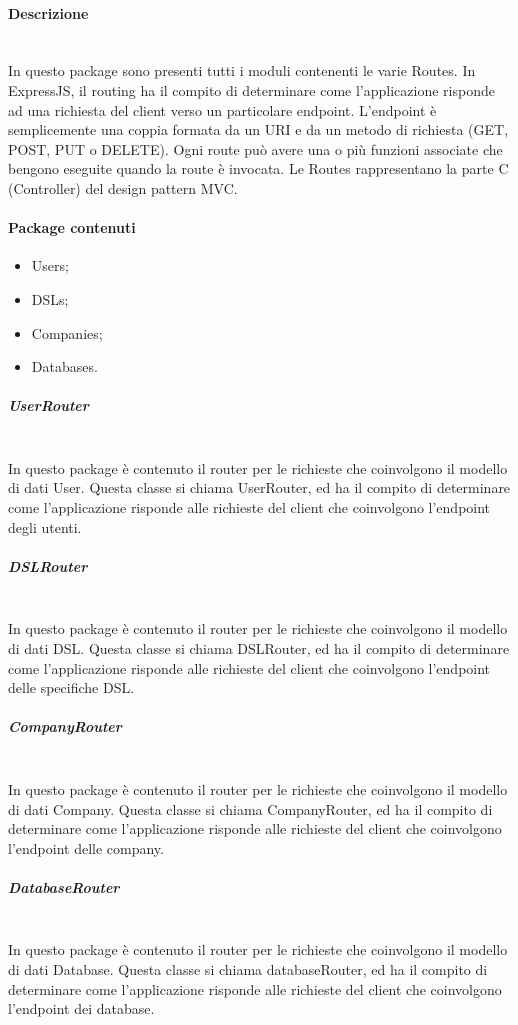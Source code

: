 \paragraph{Descrizione} \mbox{}\\
In questo package sono presenti tutti i moduli contenenti le varie Routes. In ExpressJS, il routing ha il compito di determinare come l'applicazione risponde ad una richiesta del client verso un particolare endpoint. L'endpoint è semplicemente una coppia formata da un URI e da un metodo di richiesta (GET, POST, PUT o DELETE). Ogni route può avere una o più funzioni associate che bengono eseguite quando la route è invocata. Le Routes rappresentano la parte C (Controller) del design pattern MVC.
\paragraph{Package contenuti}
\begin{itemize}
\item Users;
\item DSLs;
\item Companies;
\item Databases.
\end{itemize}
\subparagraph{UserRouter} \mbox{}\\
In questo package è contenuto il router per le richieste che coinvolgono il modello di dati User. Questa classe si chiama UserRouter, ed ha il compito di determinare come l'applicazione risponde alle richieste del client che coinvolgono l'endpoint degli utenti. 
\subparagraph{DSLRouter} \mbox{}\\
In questo package è contenuto il router per le richieste che coinvolgono il modello di dati DSL. Questa classe si chiama DSLRouter, ed ha il compito di determinare come l'applicazione risponde alle richieste del client che coinvolgono l'endpoint delle specifiche DSL. 
\subparagraph{CompanyRouter} \mbox{}\\
In questo package è contenuto il router per le richieste che coinvolgono il modello di dati Company. Questa classe si chiama CompanyRouter, ed ha il compito di determinare come l'applicazione risponde alle richieste del client che coinvolgono l'endpoint delle company. 
\subparagraph{DatabaseRouter} \mbox{}\\
In questo package è contenuto il router per le richieste che coinvolgono il modello di dati Database. Questa classe si chiama databaseRouter, ed ha il compito di determinare come l'applicazione risponde alle richieste del client che coinvolgono l'endpoint dei database. 